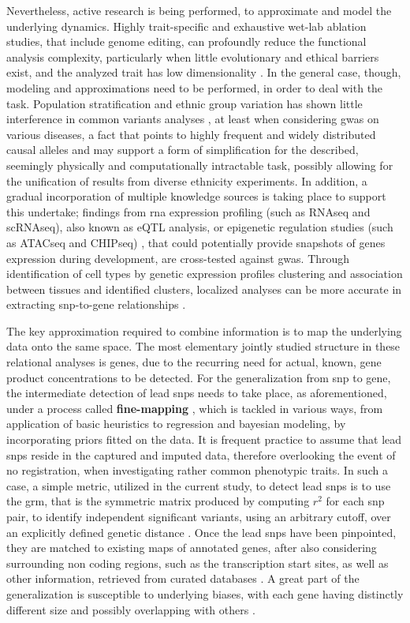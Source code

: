 Nevertheless, active research is being performed, to approximate and model the underlying dynamics. Highly trait-specific and exhaustive wet-lab ablation studies, that include genome editing, can profoundly reduce the functional analysis complexity, particularly when little evolutionary and ethical barriers exist, and the analyzed trait has low dimensionality \cite{Rao2021}. In the general case, though, modeling and approximations need to be performed, in order to deal with the task. Population stratification and ethnic group variation has shown little interference in common variants analyses \cite{Visscher2012}, at least when considering \ac{gwas} on various diseases, a fact that points to highly frequent and widely distributed causal alleles and may support a form of simplification for the described, seemingly physically and computationally intractable task, possibly allowing for the unification of results from diverse ethnicity experiments. In addition, a gradual incorporation of multiple knowledge sources is taking place to support this undertake; findings from \ac{rna} expression profiling (such as RNAseq and scRNAseq), also known as eQTL analysis, \cite{Yan2020,Zhou2022} or epigenetic regulation studies (such as ATACseq and CHIPseq) \cite{Corces2020,Huo2019}, that could potentially provide snapshots of genes expression during development, are cross-tested against \ac{gwas}. Through identification of cell types by genetic expression profiles clustering and association between tissues and identified clusters, localized analyses can be more accurate in extracting \ac{snp}-to-gene relationships \cite{Cano-Gamez2020}.

The key approximation required to combine information is to map the underlying data onto the same space. The most elementary jointly studied structure in these relational analyses is genes, due to the recurring need for actual, known, gene product concentrations to be detected. For the generalization from \ac{snp} to gene, the intermediate detection of lead \acp{snp} needs to take place, as aforementioned, under a process called \textbf{fine-mapping} \cite{Schaid2018}, which is tackled in various ways, from application of basic heuristics to regression and bayesian modeling, by incorporating priors fitted on the data. It is frequent practice to assume that lead \acp{snp} reside in the captured and imputed data, therefore overlooking the event of no registration, when investigating rather common phenotypic traits. In such a case, a simple metric, utilized in the current study, to detect lead \acp{snp} is to use the \ac{grm}, that is the symmetric matrix produced by computing $r^2$ for each \ac{snp} pair, to identify independent significant variants, using an arbitrary cutoff, over an explicitly defined genetic distance \cite{Watanabe2017}. Once the lead \acp{snp} have been pinpointed, they are matched to existing maps of annotated genes, after also considering surrounding non coding regions, such as the transcription start sites, as well as other information, retrieved from curated databases \cite{Wang2010,McLean2010}. A great part of the generalization is susceptible to underlying biases, with each gene having distinctly different size and possibly overlapping with others \cite{Wang2011}.

